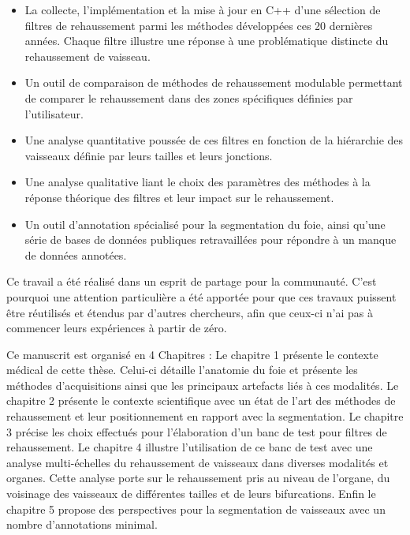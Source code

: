 \begin{itemize}
\item La collecte, l'implémentation et la mise à jour en C++ d'une sélection de filtres de rehaussement parmi les méthodes développées ces 20 dernières années. Chaque filtre illustre une réponse à une problématique distincte du rehaussement de vaisseau.
\item Un outil de comparaison de méthodes de rehaussement modulable permettant de comparer le rehaussement dans des zones spécifiques définies par l'utilisateur.
\item Une analyse quantitative poussée de ces filtres en fonction de la hiérarchie des vaisseaux définie par leurs tailles et leurs jonctions.
\item Une analyse qualitative liant le choix des paramètres des méthodes à la réponse théorique des filtres et leur impact sur le rehaussement.
\item Un outil d'annotation spécialisé pour la segmentation du foie, ainsi qu'une série de bases de données publiques retravaillées pour répondre à un manque de données annotées. 
\end{itemize}

Ce travail a été réalisé dans un esprit de partage pour la communauté. C'est pourquoi une attention particulière a été apportée pour que ces travaux puissent être réutilisés et étendus par d'autres chercheurs, afin que ceux-ci n'ai pas à commencer leurs expériences à partir de zéro.

Ce manuscrit est organisé en 4 Chapitres : Le chapitre 1 présente le contexte médical de cette thèse. Celui-ci détaille l'anatomie du foie et présente les méthodes d'acquisitions ainsi que les principaux artefacts liés à ces modalités. Le chapitre 2 présente le contexte scientifique avec un état de l'art des méthodes de rehaussement et leur positionnement en rapport avec la segmentation. Le chapitre 3 précise les choix effectués pour l'élaboration d'un banc de test pour filtres de rehaussement. Le chapitre 4 illustre l'utilisation de ce banc de test avec une analyse multi-échelles du rehaussement de vaisseaux dans diverses modalités et organes. Cette analyse porte sur le rehaussement pris au niveau de l'organe, du voisinage des vaisseaux de différentes tailles et de leurs bifurcations. Enfin le chapitre 5 propose des perspectives pour la segmentation de vaisseaux avec un nombre d'annotations minimal.